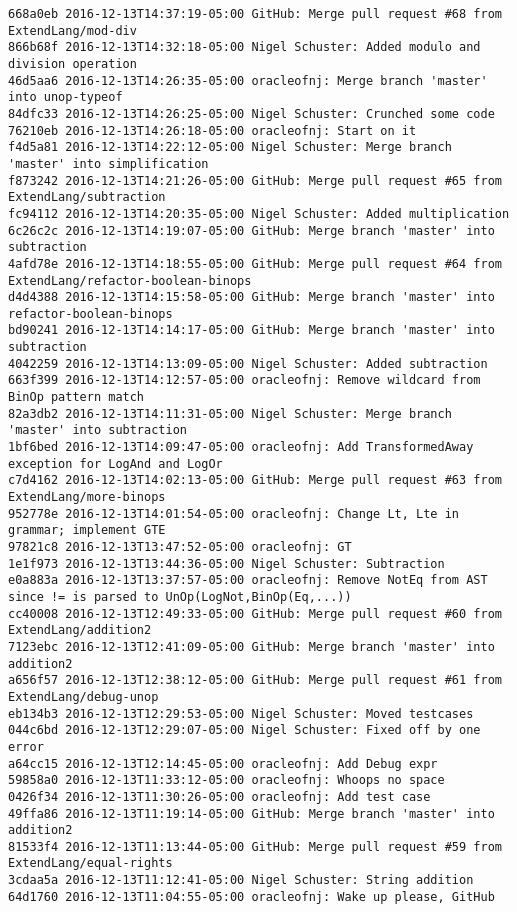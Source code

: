 \begin{lstlisting}
668a0eb 2016-12-13T14:37:19-05:00 GitHub: Merge pull request #68 from ExtendLang/mod-div
866b68f 2016-12-13T14:32:18-05:00 Nigel Schuster: Added modulo and division operation
46d5aa6 2016-12-13T14:26:35-05:00 oracleofnj: Merge branch 'master' into unop-typeof
84dfc33 2016-12-13T14:26:25-05:00 Nigel Schuster: Crunched some code
76210eb 2016-12-13T14:26:18-05:00 oracleofnj: Start on it
f4d5a81 2016-12-13T14:22:12-05:00 Nigel Schuster: Merge branch 'master' into simplification
f873242 2016-12-13T14:21:26-05:00 GitHub: Merge pull request #65 from ExtendLang/subtraction
fc94112 2016-12-13T14:20:35-05:00 Nigel Schuster: Added multiplication
6c26c2c 2016-12-13T14:19:07-05:00 GitHub: Merge branch 'master' into subtraction
4afd78e 2016-12-13T14:18:55-05:00 GitHub: Merge pull request #64 from ExtendLang/refactor-boolean-binops
d4d4388 2016-12-13T14:15:58-05:00 GitHub: Merge branch 'master' into refactor-boolean-binops
bd90241 2016-12-13T14:14:17-05:00 GitHub: Merge branch 'master' into subtraction
4042259 2016-12-13T14:13:09-05:00 Nigel Schuster: Added subtraction
663f399 2016-12-13T14:12:57-05:00 oracleofnj: Remove wildcard from BinOp pattern match
82a3db2 2016-12-13T14:11:31-05:00 Nigel Schuster: Merge branch 'master' into subtraction
1bf6bed 2016-12-13T14:09:47-05:00 oracleofnj: Add TransformedAway exception for LogAnd and LogOr
c7d4162 2016-12-13T14:02:13-05:00 GitHub: Merge pull request #63 from ExtendLang/more-binops
952778e 2016-12-13T14:01:54-05:00 oracleofnj: Change Lt, Lte in grammar; implement GTE
97821c8 2016-12-13T13:47:52-05:00 oracleofnj: GT
1e1f973 2016-12-13T13:44:36-05:00 Nigel Schuster: Subtraction
e0a883a 2016-12-13T13:37:57-05:00 oracleofnj: Remove NotEq from AST since != is parsed to UnOp(LogNot,BinOp(Eq,...))
cc40008 2016-12-13T12:49:33-05:00 GitHub: Merge pull request #60 from ExtendLang/addition2
7123ebc 2016-12-13T12:41:09-05:00 GitHub: Merge branch 'master' into addition2
a656f57 2016-12-13T12:38:12-05:00 GitHub: Merge pull request #61 from ExtendLang/debug-unop
eb134b3 2016-12-13T12:29:53-05:00 Nigel Schuster: Moved testcases
044c6bd 2016-12-13T12:29:07-05:00 Nigel Schuster: Fixed off by one error
a64cc15 2016-12-13T12:14:45-05:00 oracleofnj: Add Debug expr
59858a0 2016-12-13T11:33:12-05:00 oracleofnj: Whoops no space
0426f34 2016-12-13T11:30:26-05:00 oracleofnj: Add test case
49ffa86 2016-12-13T11:19:14-05:00 GitHub: Merge branch 'master' into addition2
81533f4 2016-12-13T11:13:44-05:00 GitHub: Merge pull request #59 from ExtendLang/equal-rights
3cdaa5a 2016-12-13T11:12:41-05:00 Nigel Schuster: String addition
64d1760 2016-12-13T11:04:55-05:00 oracleofnj: Wake up please, GitHub

\end{lstlisting}
